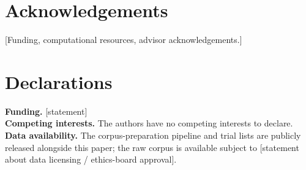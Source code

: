 \documentclass[11pt,a4paper]{article}
\begin{document}
\section*{Acknowledgements}
[Funding, computational resources, advisor acknowledgements.]

\section*{Declarations}
\noindent \textbf{Funding.} [statement] \\
\noindent \textbf{Competing interests.} The authors have no competing
interests to declare. \\
\noindent \textbf{Data availability.} The corpus-preparation pipeline
and trial lists are publicly released alongside this paper; the raw
corpus is available subject to [statement about data licensing /
ethics-board approval].



\end{document}
